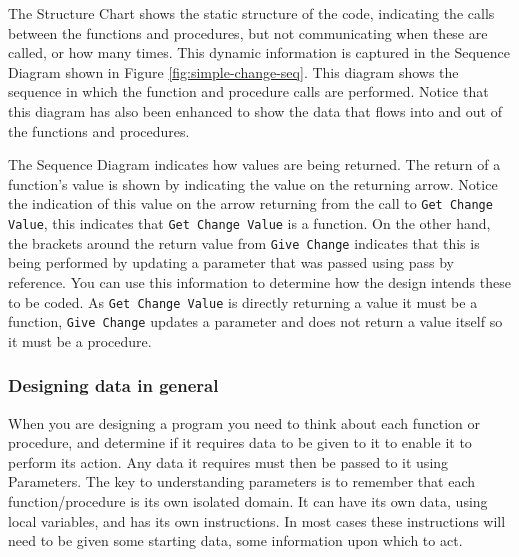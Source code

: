 The Structure Chart shows the static structure of the code, indicating the calls between the functions and procedures, but not communicating when these are called, or how many times. This dynamic information is captured in the Sequence Diagram shown in Figure \ref{fig:simple-change-seq}. This diagram shows the sequence in which the function and procedure calls are performed. Notice that this diagram has also been enhanced to show the data that flows into and out of the functions and procedures. 

The Sequence Diagram indicates how values are being returned. The return of a function's value is shown by indicating the value on the returning arrow. Notice the indication of this value on the arrow returning from the call to \texttt{Get Change Value}, this indicates that \texttt{Get Change Value} is a function. On the other hand, the brackets around the return value from \texttt{Give Change} indicates that this is being performed by updating a parameter that was passed using pass by reference. You can use this information to determine how the design intends these to be coded. As \texttt{Get Change Value} is directly returning a value it must be a function, \texttt{Give Change} updates a parameter and does not return a value itself so it must be a procedure.



\clearpage
\subsubsection{Designing data in general} %
\label{ssub:designing_data_in_genera}

When you are designing a program you need to think about each function or procedure, and determine if it requires data to be given to it to enable it to perform its action. Any data it requires must then be passed to it using Parameters. The key to understanding parameters is to remember that each function/procedure is its own isolated domain. It can have its own data, using local variables, and has its own instructions. In most cases these instructions will need to be given some starting data, some information upon which to act. 

